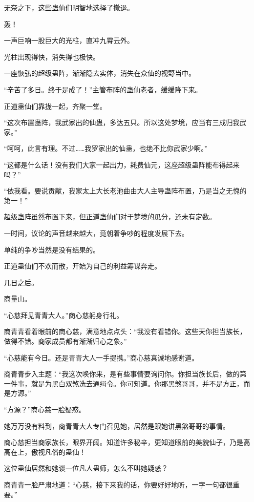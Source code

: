 \begin{this_body}
无奈之下，这些蛊仙们明智地选择了撤退。

轰！

一声巨响一股巨大的光柱，直冲九霄云外。

光柱出现得快，消失得也极快。

一座恢弘的超级蛊阵，渐渐隐去实体，消失在众仙的视野当中。

“辛苦了多日。终于是成了！”主管布阵的蛊仙老者，缓缓降下来。

正道蛊仙们靠拢一起，齐聚一堂。

“这次布置蛊阵，我武家出的仙蛊，多达五只。所以这处梦境，应当有三成归我武家。”

“呵呵，此言有理。不过……我罗家出的仙蛊，也绝不比你武家少啊。”

“这都是什么话！没有我们大家一起出力，耗费仙元，这座超级蛊阵能布得起来吗？”

“依我看。要说贡献，我家太上大长老池曲由大人主导蛊阵布置，乃是当之无愧的第一！”

超级蛊阵虽然布置下来，但正道蛊仙们对于梦境的瓜分，还未有定数。

一时间，议论的声音越来越大，竟朝着争吵的程度发展下去。

单纯的争吵当然是没有结果的。

正道蛊仙们不欢而散，开始为自己的利益筹谋奔走。

几日之后。

商量山。

“心慈拜见青青大人。”商心慈躬身行礼。

商青青看着眼前的商心慈，满意地点点头：“我没有看错你。这些天你担当族长，做得不错。商家成员都有渐渐归心之象。”

“心慈能有今日。还是青青大人一手提携。”商心慈真诚地感谢道。

商青青步入主题：“我这次唤你来，是有些事情要询问你。你担当族长后，做的第一件事，就是为黑白双煞洗去通缉令。你可知道。你那黑煞哥哥，并不是方正，而是方源。”

“方源？”商心慈一脸疑惑。

她万万没有料到，商青青大人专门召见她，居然是跟她讲黑煞哥哥的事情。

商心慈担当商家族长，眼界开阔。知道许多秘辛，更知道眼前的美貌仙子，乃是高高在上，傲视凡俗的蛊仙！

这位蛊仙居然和她谈一位凡人蛊师，怎么不叫她疑惑？

商青青一脸严肃地道：“心慈，接下来我的话，你要好好地听，一字一句都很重要。”


\end{this_body}
